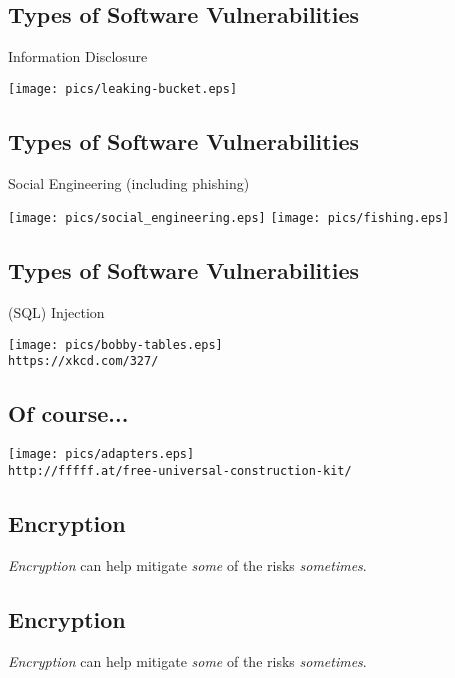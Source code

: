 \documentclass[xga]{xdvislides}
\begin{document}
\subsection{Types of Software Vulnerabilities}
Information Disclosure
\begin{center}
	\texttt{[image: pics/leaking-bucket.eps]}
\end{center}

\subsection{Types of Software Vulnerabilities}
Social Engineering (including phishing)
\begin{center}
	\texttt{[image: pics/social\_engineering.eps]}
	\texttt{[image: pics/fishing.eps]}
\end{center}

\subsection{Types of Software Vulnerabilities}
(SQL) Injection
\begin{center}
	\texttt{[image: pics/bobby-tables.eps]} \\
	\verb+https://xkcd.com/327/+
\end{center}


\subsection{Of course...}
\vspace*{\fill}
\begin{center}
	\texttt{[image: pics/adapters.eps]}  \\
	\verb+http://fffff.at/free-universal-construction-kit/+ \\
\end{center}
\vspace*{\fill}

\subsection{Encryption}
{\em Encryption} can help mitigate {\em some} of the risks {\em sometimes}.

\subsection{Encryption}
{\em Encryption} can help mitigate {\em some} of the risks {\em sometimes}.
\\
\end{document}

